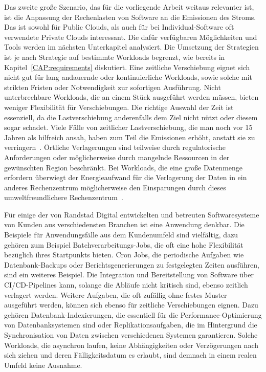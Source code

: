 Das zweite große Szenario, das für die vorliegende Arbeit weitaus relevanter ist, ist die Anpassung der Rechenlasten von Software an die Emissionen des Stroms.
Das ist sowohl für Public Clouds, als auch für bei Individual-Software oft verwendete Private Clouds interessant.
Die dafür verfügbaren Möglichkeiten und Tools werden im nächsten Unterkapitel analysiert.
Die Umsetzung der Strategien ist je nach Strategie auf bestimmte Workloads begrenzt, wie bereits in Kapitel~\ref{CAP:requirements} diskutiert.
Eine zeitliche Verschiebung eignet sich nicht gut für lang andauernde oder kontinuierliche Workloads, sowie solche mit strikten Fristen oder Notwendigkeit zur sofortigen Ausführung.
Nicht unterbrechbare Workloads, die an einem Stück ausgeführt werden müssen, bieten weniger Flexibilität für Verschiebungen.
Die richtige Auswahl der Zeit ist essenziell, da die Lastverschiebung anderenfalls dem Ziel nicht nützt oder diesem sogar schadet.
Viele Fälle von zeitlicher Lastverschiebung, die man noch vor 15 Jahren als hilfreich ansah, haben zum Teil die Emissionen erhöht, anstatt sie zu verringern~\cite{WattTime.12.3.2024}.
Örtliche Verlagerungen sind teilweise durch regulatorische Anforderungen oder möglicherweise durch mangelnde Ressourcen in der gewünschten Region beschränkt.
Bei Workloads, die eine große Datenmenge erfordern überwiegt der Energieaufwand für die Verlagerung der Daten in ein anderes Rechenzentrum möglicherweise den Einsparungen durch dieses umweltfreundlichere Rechenzentrum~\cite{Norlander.2023}.

Für einige der von Randstad Digital entwickelten und betreuten Softwaresysteme von Kunden aus verschiedensten Branchen ist eine Anwendung denkbar.
Die Beispiele für Anwendungsfälle aus dem Kundenumfeld sind vielfältig, dazu gehören zum Beispiel Batchverarbeitungs-Jobs, die oft eine hohe Flexibilität bezüglich ihres Startpunkts bieten.
Cron Jobs, die periodische Aufgaben wie Datenbank-Backups oder Berichtsgenerierungen zu festgelegten Zeiten ausführen, sind ein weiteres Beispiel.
Die Integration und Bereitstellung von Software über CI/CD-Pipelines kann, solange die Abläufe nicht kritisch sind, ebenso zeitlich verlagert werden.
Weitere Aufgaben, die oft zufällig ohne festes Muster ausgeführt werden, können sich ebenso für zeitliche Verschiebungen eignen.
Dazu gehören Datenbank-Indexierungen, die essentiell für die Performance-Optimierung von Datenbanksystemen sind oder Replikationsaufgaben, die im Hintergrund die Synchronisation von Daten zwischen verschiedenen Systemen garantieren.
Solche Workloads, die asynchron laufen, keine Abhängigkeiten oder Verzögerungen nach sich ziehen und deren Fälligkeitsdatum es erlaubt, sind demnach in einem realen Umfeld keine Ausnahme.

